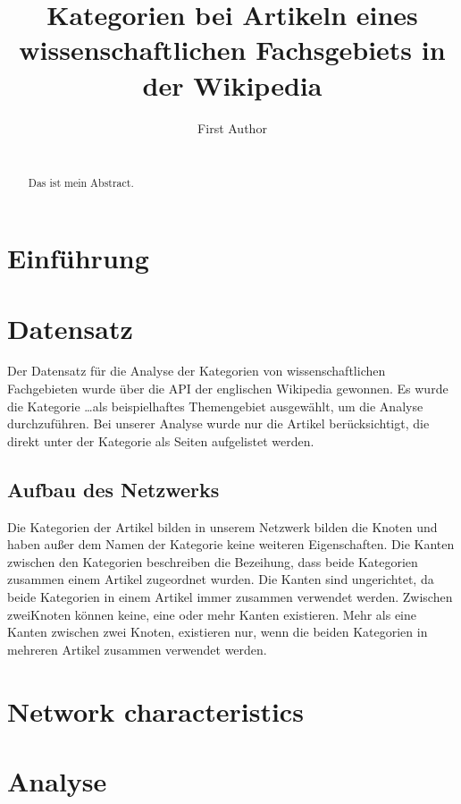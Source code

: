 \documentclass{acm_proc_article-sp}
\begin{document}
\title{Kategorien bei Artikeln eines wissenschaftlichen Fachsgebiets in der Wikipedia}

\author{
\alignauthor
	First Author\\
	\\
}

\maketitle
\begin{abstract}
	Das ist mein Abstract.
\end{abstract}

\section{Einführung}
\section{Datensatz}
Der Datensatz für die Analyse der Kategorien von wissenschaftlichen Fachgebieten wurde über die API der englischen Wikipedia gewonnen. Es wurde die Kategorie \ldots als beispielhaftes Themengebiet ausgewählt, um die Analyse durchzuführen. Bei unserer Analyse wurde nur die Artikel berücksichtigt, die direkt unter der Kategorie als Seiten aufgelistet werden.
\subsection{Aufbau des Netzwerks}
Die Kategorien der Artikel bilden in unserem Netzwerk bilden die Knoten und haben außer dem Namen der Kategorie keine weiteren Eigenschaften. Die Kanten zwischen den Kategorien beschreiben die Bezeihung, dass beide Kategorien zusammen einem Artikel zugeordnet wurden. Die Kanten sind ungerichtet, da beide Kategorien in einem Artikel immer zusammen verwendet werden. Zwischen zweiKnoten können keine, eine oder mehr Kanten existieren. Mehr als eine Kanten zwischen zwei Knoten, existieren nur, wenn die beiden Kategorien in mehreren Artikel zusammen verwendet werden.
\section{Network characteristics}
\section{Analyse}
\end{document}
